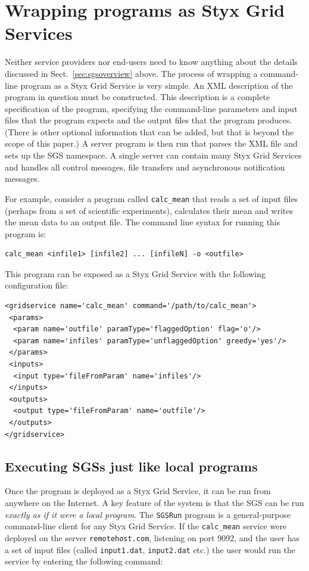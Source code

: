 \documentclass{llncs}
\begin{document}
\section{Wrapping programs as Styx Grid Services}\label{sec:wrapping}
Neither service providers nor end-users need to know anything about the details discussed in Sect.~\ref{sec:sgsoverview} above.  The process of wrapping a command-line program as a Styx Grid Service is very simple.  An XML description of the program in question must be constructed.  This description is a complete specification of the program, specifying the command-line parameters and input files that the program expects and the output files that the program produces.  (There is other optional information that can be added, but that is beyond the scope of this paper.)  A server program is then run that parses the XML file and sets up the SGS namespace.  A single server can contain many Styx Grid Services and handles all control messages, file transfers and asynchronous notification messages.

For example, consider a program called {\tt calc\_mean} that reads a set of input files (perhaps from a set of scientific experiments), calculates their mean and writes the mean data to an output file.  The command line syntax for running this program is:

\begin{verbatim}
calc_mean <infile1> [infile2] ... [infileN] -o <outfile>
\end{verbatim}

This program can be exposed as a Styx Grid Service with the following configuration file:

\begin{verbatim}
<gridservice name='calc_mean' command='/path/to/calc_mean'>
 <params>
  <param name='outfile' paramType='flaggedOption' flag='o'/>
  <param name='infiles' paramType='unflaggedOption' greedy='yes'/>
 </params>
 <inputs>
  <input type='fileFromParam' name='infiles'/>
 </inputs>
 <outputs>
  <output type='fileFromParam' name='outfile'/>
 </outputs>
</gridservice>
\end{verbatim}

\subsection{Executing SGSs just like local programs}

Once the program is deployed as a Styx Grid Service, it can be run from anywhere on the Internet.  A key feature of the system is that the SGS can be run {\em exactly as if it were a local program\/}.  The {\tt SGSRun} program is a general-purpose command-line client for any Styx Grid Service.  If the {\tt calc\_mean} service were deployed on the server {\tt remotehost.com}, listening on port 9092, and the user has a set of input files (called {\tt input1.dat}, {\tt input2.dat} etc.) the user would run the service by entering the following command:
\end{document}
